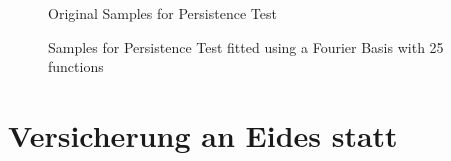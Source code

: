 \documentclass[12pt, a4paper]{article}
\theoremstyle{MAstyle} \newtheorem{assumption}{Assumption}[section]
\theoremstyle{MAstyle} \newtheorem{definition}{Definition}[section]
\theoremstyle{MAstyle} \newtheorem{theorem}{Theorem}[section]
\begin{document}
			\begin{figure}[H]
				\caption{Original Samples for Persistence Test}
				\label{persistence_samples}
			\end{figure}
			
		
			\begin{figure}[H]
				\caption{Samples for Persistence Test fitted using a Fourier Basis with 25 functions}
				\label{persistence_samples_basis_problem}
			\end{figure}
		
		
		
	\newpage
	\thispagestyle{empty}
	\section*{Versicherung an Eides statt}	
	
\end{document}
